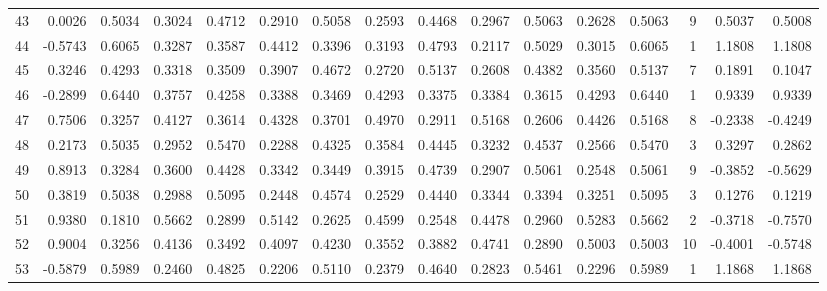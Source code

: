 \begin{tabular}{lrrrrrrrrrrrrrrr}
43  &      0.0026 &  0.5034 &  0.3024 &  0.4712 &  0.2910 &  0.5058 &  0.2593 &  0.4468 &  0.2967 &  0.5063 &   0.2628 &     0.5063 &      9 &                    0.5037 &                     0.5008 \\
44  &     -0.5743 &  0.6065 &  0.3287 &  0.3587 &  0.4412 &  0.3396 &  0.3193 &  0.4793 &  0.2117 &  0.5029 &   0.3015 &     0.6065 &      1 &                    1.1808 &                     1.1808 \\
45  &      0.3246 &  0.4293 &  0.3318 &  0.3509 &  0.3907 &  0.4672 &  0.2720 &  0.5137 &  0.2608 &  0.4382 &   0.3560 &     0.5137 &      7 &                    0.1891 &                     0.1047 \\
46  &     -0.2899 &  0.6440 &  0.3757 &  0.4258 &  0.3388 &  0.3469 &  0.4293 &  0.3375 &  0.3384 &  0.3615 &   0.4293 &     0.6440 &      1 &                    0.9339 &                     0.9339 \\
47  &      0.7506 &  0.3257 &  0.4127 &  0.3614 &  0.4328 &  0.3701 &  0.4970 &  0.2911 &  0.5168 &  0.2606 &   0.4426 &     0.5168 &      8 &                   -0.2338 &                    -0.4249 \\
48  &      0.2173 &  0.5035 &  0.2952 &  0.5470 &  0.2288 &  0.4325 &  0.3584 &  0.4445 &  0.3232 &  0.4537 &   0.2566 &     0.5470 &      3 &                    0.3297 &                     0.2862 \\
49  &      0.8913 &  0.3284 &  0.3600 &  0.4428 &  0.3342 &  0.3449 &  0.3915 &  0.4739 &  0.2907 &  0.5061 &   0.2548 &     0.5061 &      9 &                   -0.3852 &                    -0.5629 \\
50  &      0.3819 &  0.5038 &  0.2988 &  0.5095 &  0.2448 &  0.4574 &  0.2529 &  0.4440 &  0.3344 &  0.3394 &   0.3251 &     0.5095 &      3 &                    0.1276 &                     0.1219 \\
51  &      0.9380 &  0.1810 &  0.5662 &  0.2899 &  0.5142 &  0.2625 &  0.4599 &  0.2548 &  0.4478 &  0.2960 &   0.5283 &     0.5662 &      2 &                   -0.3718 &                    -0.7570 \\
52  &      0.9004 &  0.3256 &  0.4136 &  0.3492 &  0.4097 &  0.4230 &  0.3552 &  0.3882 &  0.4741 &  0.2890 &   0.5003 &     0.5003 &     10 &                   -0.4001 &                    -0.5748 \\
53  &     -0.5879 &  0.5989 &  0.2460 &  0.4825 &  0.2206 &  0.5110 &  0.2379 &  0.4640 &  0.2823 &  0.5461 &   0.2296 &     0.5989 &      1 &                    1.1868 &                     1.1868 \\

\end{tabular}
